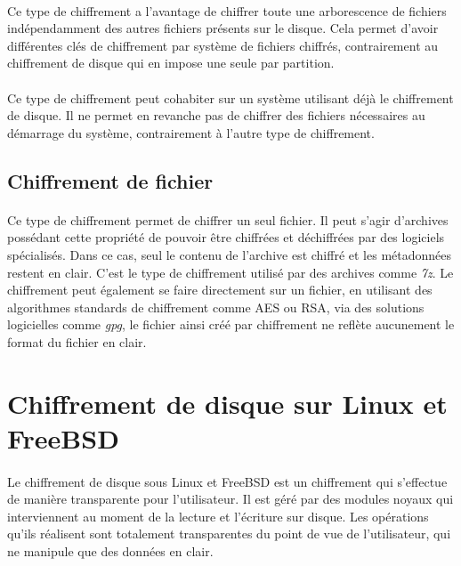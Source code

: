 \paragraph{}
Ce type de chiffrement a l'avantage de chiffrer toute une arborescence de
fichiers indépendamment des autres fichiers présents sur le disque. Cela permet
d'avoir différentes clés de chiffrement par système de fichiers chiffrés,
contrairement au chiffrement de disque qui en impose une seule par partition.
\paragraph{}
Ce type de chiffrement peut cohabiter sur un système utilisant déjà le
chiffrement de disque. Il ne permet en revanche pas de chiffrer des fichiers
nécessaires au démarrage du système, contrairement à l'autre type de
chiffrement.

\subsection{Chiffrement de fichier}
\paragraph{}
Ce type de chiffrement permet de chiffrer un seul fichier. Il peut s'agir
d'archives possédant cette propriété de pouvoir être chiffrées et déchiffrées
par des logiciels spécialisés. Dans ce cas, seul le contenu de l'archive est
chiffré et les métadonnées restent en clair. C'est le type de chiffrement
utilisé par des archives comme \textit{7z}. Le chiffrement peut également se
faire directement sur un fichier, en utilisant des algorithmes standards de 
chiffrement comme AES ou RSA, via des solutions logicielles comme
\textit{gpg}, le fichier ainsi créé par chiffrement ne reflète aucunement
le format du fichier en clair.


\section{Chiffrement de disque sur Linux et FreeBSD}

\paragraph{}
Le chiffrement de disque sous Linux et FreeBSD est un chiffrement qui s'effectue
de manière transparente pour l'utilisateur.
Il est géré par des modules noyaux qui interviennent au moment de la lecture et
l'écriture sur disque. Les opérations qu'ils réalisent sont totalement
transparentes du point de vue de l'utilisateur, qui ne manipule que des données
en clair.
